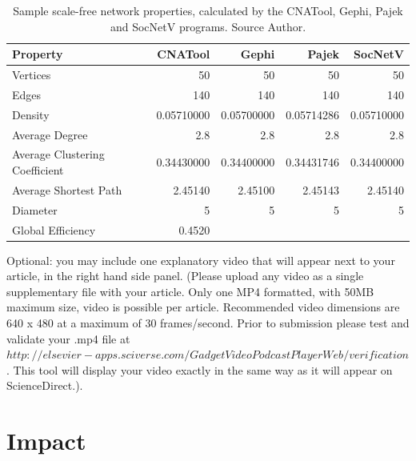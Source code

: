 \documentclass[preprint,12pt, a4paper]{elsarticle}
\begin{document}
\begin{table}[]
\centering
\begin{tabular}{|l|r|r|r|r|}
\hline
\textbf{Property}              & \textbf{CNATool} & \textbf{Gephi} & \textbf{Pajek} & \textbf{SocNetV} \\ \hline
Vertices                       & 50               & 50             & 50             & 50               \\ \hline
Edges                          & 140              & 140            & 140            & 140              \\ \hline
Density                        & 0.05710000       & 0.05700000     & 0.05714286     & 0.05710000       \\ \hline
Average Degree                 & 2.8              & 2.8            & 2.8            & 2.8              \\ \hline
Average Clustering Coefficient & 0.34430000       & 0.34400000     & 0.34431746     & 0.34400000       \\ \hline
Average Shortest Path          & 2.45140          & 2.45100        & 2.45143        & 2.45140          \\ \hline
Diameter                       & 5                & 5              & 5              & 5                \\ \hline
Global Efficiency              & 0.4520           &                &                &                  \\ \hline
\end{tabular}
\caption{Sample scale-free network properties, calculated by the CNATool, Gephi, Pajek and SocNetV programs. Source Author.}
\label{tab:properties}
\end{table}

Optional: you may include one explanatory video that will appear next to your article, in the right hand side panel. (Please upload any video as a single supplementary file with your article. Only one MP4 formatted, with 50MB maximum size, video is possible per article. Recommended video dimensions are 640 x 480 at a maximum of 30 frames/second. Prior to submission please test and validate your .mp4 file at $ http://elsevier-apps.sciverse.com/GadgetVideoPodcastPlayerWeb/verification$. This tool will display your video exactly in the same way as it will appear on ScienceDirect.).

\section{Impact}
\label{impact}
\end{document}
